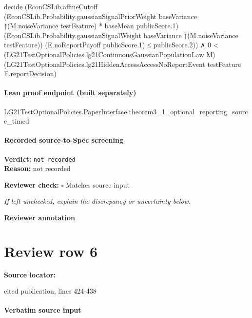 \documentclass[10pt]{article}
\newcommand{\reviewerbox}{%
  \par\noindent\fbox{\parbox{0.96\linewidth}{\rule{0pt}{0.38in}}}\par
}
\newcommand{\reviewmatch}[1]{%
  \par\noindent\textbf{Reviewer check:} $\square$\; #1\par
  \noindent\emph{If left unchecked, explain the discrepancy or uncertainty below.}\par
}
\begin{document}
\begin{ReviewVerbatim}
                                decide
                                  (EconCSLib.affineCutoff
                                      (EconCSLib.Probability.gaussianSignalPriorWeight baseVariance
                                          ↑(M.noiseVariance testFeature) *
                                        baseMean publicScore.1)
                                      (EconCSLib.Probability.gaussianSignalWeight baseVariance
                                        ↑(M.noiseVariance testFeature))
                                      (E.noReportPayoff publicScore.1) ≤
                                    publicScore.2)) ∧
                            0 <
                              (LG21TestOptionalPolicies.lg21ContinuousGaussianPopulationLaw M)
                                (LG21TestOptionalPolicies.lg21HiddenAccessAccessNoReportEvent testFeature
                                  E.reportDecision)
\end{ReviewVerbatim}

\paragraph{Lean proof endpoint (built separately)}\begin{ReviewVerbatim}
LG21TestOptionalPolicies.PaperInterface.theorem3_1_optional_reporting_source_timed
\end{ReviewVerbatim}

\paragraph{Recorded source-to-Spec screening}
\textbf{Verdict:} \texttt{not recorded}
\\
\textbf{Reason:} not recorded
\reviewmatch{Matches source input}
\noindent\textbf{Reviewer annotation}\par
\reviewerbox
\clearpage
\hypertarget{source-claim-017682a01e0507bb}{}
\section*{Review row 6}
\textbf{Source locator:} {\footnotesize\raggedright cited publication, lines 424-\allowbreak{}438\par}
\paragraph{Verbatim source input}
\begin{ReviewVerbatim}
\end{ReviewVerbatim}
\end{document}
